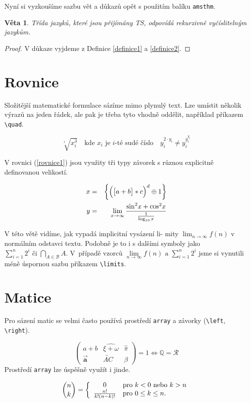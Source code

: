 \documentclass[twocolumn, a4paper, 11pt]{article}
\begin{document}
Nyní si vyzkoušíme sazbu vět a důkazů opět s použitím
balíku \texttt{amsthm}.

\newtheorem{veta}{Věta}
\begin{veta}
    Třída jazyků, které jsou přijímány TS, odpovídá
    \textnormal{rekurzivně vyčíslitelným jazykům.}
\end{veta}

\begin{proof}
    V důkaze vyjdeme z Definice \ref{definice1} a \ref{definice2}.
\end{proof}

\section{Rovnice}
Složitější matematické formulace sázíme mimo plynulý text. Lze umístit několik výrazů na jeden řádek, ale pak je třeba tyto vhodně oddělit, například příkazem \verb|\quad|.

$$\sqrt[i]{x^3_i} \quad \text{kde $x_i$ je $i$-té sudé číslo}\quad y_i^{2\cdot y_i}\neq y_i^{y_i^{y_i}}$$

V rovnici (\ref{rovnice1}) jsou využity tři typy závorek s různou explicitně definovanou velikostí.

\begin{eqnarray}
    \label{rovnice1}
    x & = & \bigg\{ \Big( \big[a+b\big]\ast c\Big)^d \oplus 1\bigg\}\\
    \label{rovnice2}
    y & = & \lim\limits_{x \to \infty} \frac{\textnormal{\fontfamily{cmr}\selectfont{sin}}^2 x + \textnormal{\fontfamily{cmr}\selectfont{cos}}^2 x}{\frac{1}{\log_{10} x}}
\end{eqnarray}

V této větě vidíme, jak vypadá implicitní vysázení li-
mity $\lim_{n\rightarrow\infty} f(n)$ v normálním odstavci textu. Podobně je to i s dalšími symboly jako $\sum\nolimits_{i=1}^{n}2^i \text{ či } \bigcap_{A\in\mathcal{B}} A$. V~pří\-padě vzorců $\lim\limits_{n \to \infty}f(n) \text{ a } \sum\limits_{i=1}^{n}2^i$ jsme si vynutili méně úspornou sazbu příkazem \verb|\limits|.

\section{Matice}
Pro sázení matic se velmi často používá prostředí \texttt{array} a závorky (\verb|\left|, \verb|\right|).

\begin{equation*}
    \left(
    \begin{array}{ccc}
        a+b & \widehat{\xi + \omega} & \hat{\pi} \\
        \vec{\mathbf{a}} & \overleftrightarrow{AC} & \beta 
    \end{array}
    \right) = 1 \Longleftrightarrow \mathbb{Q} = \mathcal{R}
\end{equation*}
Prostředí \texttt{array} lze úspěšně využít i jinde.

\begin{equation*}
    \binom{n}{k} = 
    \left\{ 
    \begin{array}{c l}
        0 & \mbox{pro $k < 0$ nebo $k > n$}\\
        \frac{n!}{k!(n-k)!} & \mbox{pro $0 \leq k \leq n$}.
    \end{array} 
    \right.
\end{equation*}
\end{document}
